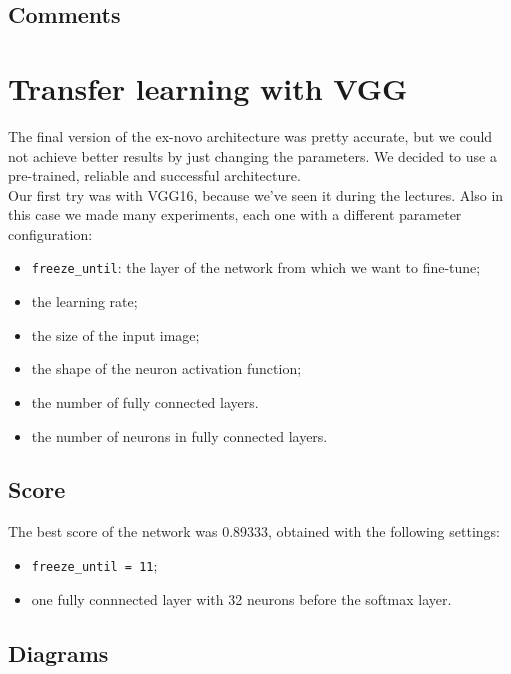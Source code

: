 \documentclass[12pt,a4paper]{report}
\begin{document}
		\subsection{Comments}
		
		\section{Transfer learning with VGG}
	The final version of the ex-novo architecture was pretty accurate, but we could not achieve better results by just changing the parameters. We decided to use a pre-trained, reliable and successful architecture.\\
	Our first try was with VGG16, because we've seen it during the lectures. Also in this case we made many experiments, each one with a different parameter configuration:
	\begin{itemize}
		\item \texttt{freeze\_until}: the layer of the network from which we want to fine-tune;
		\item the learning rate;
		\item the size of the input image;
		\item the shape of the neuron activation function;	
		\item the number of fully connected layers.
		\item the number of neurons in fully connected layers.
	\end{itemize}
		\subsection{Score}
The best score of the network was 0.89333, obtained with the following settings: 
	\begin{itemize}
		\item	\texttt{freeze\_until = 11};
		\item one fully connnected layer with 32 neurons before the softmax layer.
	\end{itemize}

		\subsection{Diagrams}
		
\end{document}
